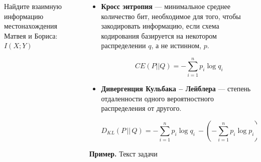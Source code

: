 \documentclass[final]{beamer}
\newlength{\sepwid}
\newlength{\onecolwid}
\newlength{\twocolwid}
\begin{document}
\begin{frame}[t]
\begin{columns}[t]
\begin{column}{\onecolwid}
\begin{alertblock}{}
	Найдите взаимную информацию местонахождения Матвея и Бориса: $I(X; Y)$  
    
\end{alertblock}




\end{column} %

\begin{column}{\sepwid}\end{column} %

\begin{column}{\twocolwid} %

\begin{columns}[t,totalwidth=\twocolwid] %

\begin{column}{\onecolwid}\vspace{-.6in} %




\begin{itemize}
	\item \textbf{Кросс энтропия} --- минимальное среднее количество бит, необходимое для того, чтобы закодировать информацию, если схема кодирования базируется на некотором распределении $q$, а не истинном, $p$.
	
	\[CE(P||Q)=-\sum\limits_{i=1}^{n}p_i\log q_i \]
	
	\item \textbf{Дивергенция Кульбака -- Лейблера} --- степень отдаленности одного вероятностного распределения от другого.
	
	\[D_{KL}(P\, ||\, Q)=  - \sum\limits_{i=1}^n p_i\log q_i\ - ( - \sum\limits_{i=1}^n p_i\log p_i)\]
\end{itemize}
	
\textbf{Пример.} Текст задачи


\end{column}
\end{columns}
\end{column}
\end{columns}
\end{frame}
\end{document}
